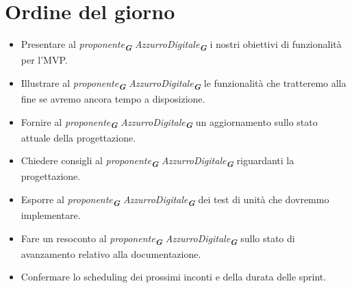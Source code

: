 

\section{Ordine del giorno}

\begin{itemize}
    \item Presentare al \emph{proponente}\textsubscript{\textbf{\textit{G}}} \emph{AzzurroDigitale}\textsubscript{\textbf{\textit{G}}} i nostri obiettivi di funzionalità per l'MVP.
    \item Illustrare al \emph{proponente}\textsubscript{\textbf{\textit{G}}} \emph{AzzurroDigitale}\textsubscript{\textbf{\textit{G}}} le funzionalità che tratteremo alla fine se avremo ancora tempo a disposizione.
    \item Fornire al \emph{proponente}\textsubscript{\textbf{\textit{G}}} \emph{AzzurroDigitale}\textsubscript{\textbf{\textit{G}}} un aggiornamento sullo stato attuale della progettazione.
    \item Chiedere consigli al \emph{proponente}\textsubscript{\textbf{\textit{G}}} \emph{AzzurroDigitale}\textsubscript{\textbf{\textit{G}}} riguardanti la progettazione.
    \item Esporre al \emph{proponente}\textsubscript{\textbf{\textit{G}}} \emph{AzzurroDigitale}\textsubscript{\textbf{\textit{G}}} dei test di unità che dovremmo implementare.
    \item Fare un resoconto al \emph{proponente}\textsubscript{\textbf{\textit{G}}} \emph{AzzurroDigitale}\textsubscript{\textbf{\textit{G}}} sullo stato di avanzamento relativo alla documentazione.
    \item Confermare lo scheduling dei prossimi inconti e della durata delle sprint.
\end{itemize}